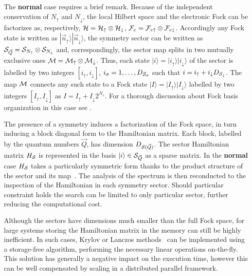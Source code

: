 \documentclass[final,3p,10pt]{elsarticle}
\newcommand{\onlinecite}[1]{\nocite{#1}\hspace{-0.1cm}\citenum{#1}}
\newcommand{\ket}[1]
{|#1\rangle}
\def\up{\uparrow} \def\down{\downarrow} \def\dw{\downarrow}
\begin{document}
The {\bf normal} case requires a brief remark. Because of the
independent conservation of $N_\up$ and $N_\dw$, the local Hilbert
space and the electronic Fock can be factorizes as, respectively,
$\HH=\HH_\up\otimes\HH_\dw$, $\FF_e = \FF_{e\up}\otimes \FF_{e\dw}$.  
Accordingly any Fock state is written as $\ket{\vec{n}_\up}\ket{\vec{n}_\dw}$, the symmetry sector can be written as  $\SS_{\vec{Q}} = \SS_{N_\up}\otimes
\SS_{N_\dw}$ and, correspondingly, the sector map splits in two
mutually exclusive ones $\MM = \MM_\up
\otimes \MM_\dw$.
Thus, each state $\ket{i}=\ket{i_\up}\ket{i_\dw}$ of the
sector is labelled by two integers $[i_\up,i_\dw]$, 
$i_\sigma=1,\dots,D_{{\cal S}_\sigma}$ such that $i=i_\up + i_\dw
D_{\SS_\dw}$. The map ${\cal M}$ connects any such state to a Fock state
$\ket{I}=\ket{I_\up}\ket{I_\dw}$ labelled by two integers
$[I_\up,I_\dw]$ as $I=I_\up +   I_\dw 2^{N_s}$. For a thorough
discussion about Fock basis organization in this case see
\onlinecite{amaricci2022}. 

The presence of a symmetry induces a factorization of the Fock space,
in turn inducing a block diagonal form to the Hamiltonian matrix.
Each block, labelled by the quantum numbers $\vec{Q}$, has dimension
$D_{{\cal S}(\vec{Q})}$. The sector Hamiltonian matrix $H_{\cal S}$ is represented in the
basis $\ket{i}\in\SS_{\vec{Q}}$ as a sparse matrix. In the {\bf
  normal} case $H_{\cal S}$ takes a particularly symmetric form thanks to
the product structure of the sector and its map~\cite{amaricci2022}.
The analysis of the spectrum is then reconducted to the inspection of
the Hamiltonian in each symmetry sector. Should particular constraint
holds the search can be limited to only particular sector, further
reducing the computational cost. 

Although the sectors have dimensions much smaller than the full Fock
space, for large systems storing the Hamiltonian matrix in the memory
can still be highly inefficient.
In such cases, Krylov or Lanczos methods~\cite{Lanczos1950JRNBSB,Lin1993CIP,Lehoucq1998,Maschhoff1996} can
be implemented using a storage-free algorithm, performing the
necessary linear operations on-the-fly.
This solution has generally a negative impact on the execution
time, however this can be well compensated by scaling in a distributed 
parallel framework.
\end{document}

